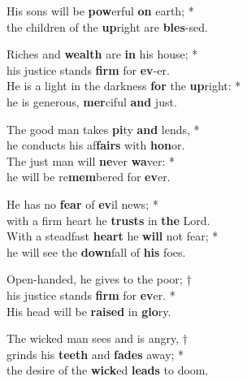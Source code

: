 His sons will be \textbf{pow}erful \textbf{on} earth; *\\
the children of the \textbf{up}right are \textbf{bles}-sed.

Riches and \textbf{wealth} are \textbf{in} his house; *\\
his justice stands \textbf{firm} for \textbf{ev}-er.\\
He is a light in the darkness \textbf{for} the \textbf{up}right: *\\
he is generous, \textbf{mer}ciful \textbf{and} just.

The good man takes \textbf{pi}ty \textbf{and} lends, *\\
he conducts his af\textbf{fairs} with \textbf{hon}or.\\
The just man will \textbf{ne}ver \textbf{wa}ver: *\\
he will be re\textbf{mem}bered for \textbf{ev}er.

He has no \textbf{fear} of \textbf{ev}il news; *\\
with a firm heart he \textbf{trusts} in \textbf{the} Lord.\\
With a steadfast \textbf{heart} he \textbf{will} not fear; *\\
he will see the \textbf{down}fall of \textbf{his} foes.

Open-handed, he gives to the poor; †\\
his justice stands \textbf{firm} for \textbf{ev}er. *\\
His head will be \textbf{raised} in \textbf{glo}ry.

The wicked man sees and is angry, †\\
grinds his \textbf{teeth} and \textbf{fades} away; *\\
the desire of the \textbf{wick}ed \textbf{leads} to doom.
